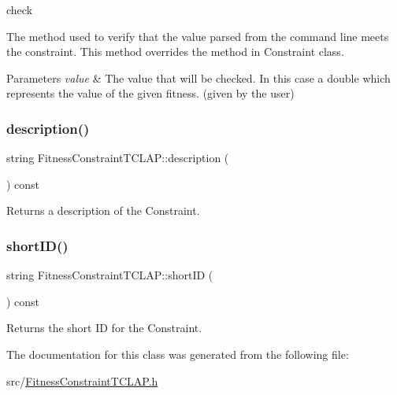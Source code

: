 check 

The method used to verify that the value parsed from the command line meets the constraint. This method overrides the method in Constraint class. 
\begin{DoxyParams}{Parameters}
{\em value} & The value that will be checked. In this case a double which represents the value of the given fitness. (given by the user) \\
\hline
\end{DoxyParams}
\hypertarget{class_fitness_constraint_t_c_l_a_p_a95e7c197a859f649b8733b6b64e35abd}{}\label{class_fitness_constraint_t_c_l_a_p_a95e7c197a859f649b8733b6b64e35abd} 
\subsubsection{\texorpdfstring{description()}{description()}}
{\footnotesize\ttfamily string Fitness\+Constraint\+T\+C\+L\+A\+P\+::description (\begin{DoxyParamCaption}{ }\end{DoxyParamCaption}) const\hspace{0.3cm}{\ttfamily [virtual]}}

Returns a description of the Constraint. \hypertarget{class_fitness_constraint_t_c_l_a_p_a48d7dbb2e7260946d791b8a197a67917}{}\label{class_fitness_constraint_t_c_l_a_p_a48d7dbb2e7260946d791b8a197a67917} 
\subsubsection{\texorpdfstring{short\+I\+D()}{shortID()}}
{\footnotesize\ttfamily string Fitness\+Constraint\+T\+C\+L\+A\+P\+::short\+ID (\begin{DoxyParamCaption}{ }\end{DoxyParamCaption}) const\hspace{0.3cm}{\ttfamily [virtual]}}

Returns the short ID for the Constraint. 

The documentation for this class was generated from the following file\+:\begin{DoxyCompactItemize}
\item 
src/\hyperlink{_fitness_constraint_t_c_l_a_p_8h}{Fitness\+Constraint\+T\+C\+L\+A\+P.\+h}\end{DoxyCompactItemize}
